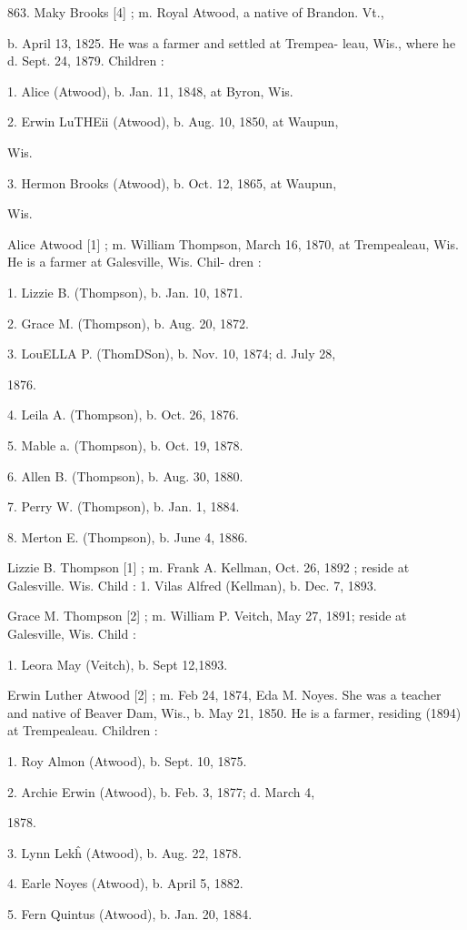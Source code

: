 863. Maky Brooks [4] ; m. Royal Atwood, a native of Brandon. Vt., 

b. April 13, 1825. He was a farmer and settled at Trempea- 
leau, Wis., where he d. Sept. 24, 1879. Children : 

1. Alice (Atwood), b. Jan. 11, 1848, at Byron, Wis. 

2. Erwin LuTHEii (Atwood), b. Aug. 10, 1850, at Waupun, 

Wis. 

3. Hermon Brooks (Atwood), b. Oct. 12, 1865, at Waupun, 

Wis. 

Alice Atwood [1] ; m. William Thompson, March 16, 1870, at 
Trempealeau, Wis. He is a farmer at Galesville, Wis. Chil- 
dren : 

1. Lizzie B. (Thompson), b. Jan. 10, 1871. 

2. Grace M. (Thompson), b. Aug. 20, 1872. 

3. LouELLA P. (ThomDSon), b. Nov. 10, 1874; d. July 28, 

1876. 

4. Leila A. (Thompson), b. Oct. 26, 1876. 

5. Mable a. (Thompson), b. Oct. 19, 1878. 

6. Allen B. (Thompson), b. Aug. 30, 1880. 

7. Perry W. (Thompson), b. Jan. 1, 1884. 

8. Merton E. (Thompson), b. June 4, 1886. 

Lizzie B. Thompson [1] ; m. Frank A. Kellman, Oct. 26, 1892 ; 
reside at Galesville. Wis. Child : 
1. Vilas Alfred (Kellman), b. Dec. 7, 1893. 

Grace M. Thompson [2] ; m. William P. Veitch, May 27, 1891; 
reside at Galesville, Wis. Child : 

1. Leora May (Veitch), b. Sept 12,1893. 

Erwin Luther Atwood [2] ; m. Feb 24, 1874, Eda M. Noyes. 
She was a teacher and native of Beaver Dam, Wis., b. May 
21, 1850. He is a farmer, residing (1894) at Trempealeau. 
Children : 

1. Roy Almon (Atwood), b. Sept. 10, 1875. 

2. Archie Erwin (Atwood), b. Feb. 3, 1877; d. March 4, 

1878. 

3. Lynn Lek\^h (Atwood), b. Aug. 22, 1878. 

4. Earle Noyes (Atwood), b. April 5, 1882. 

5. Fern Quintus (Atwood), b. Jan. 20, 1884. 

